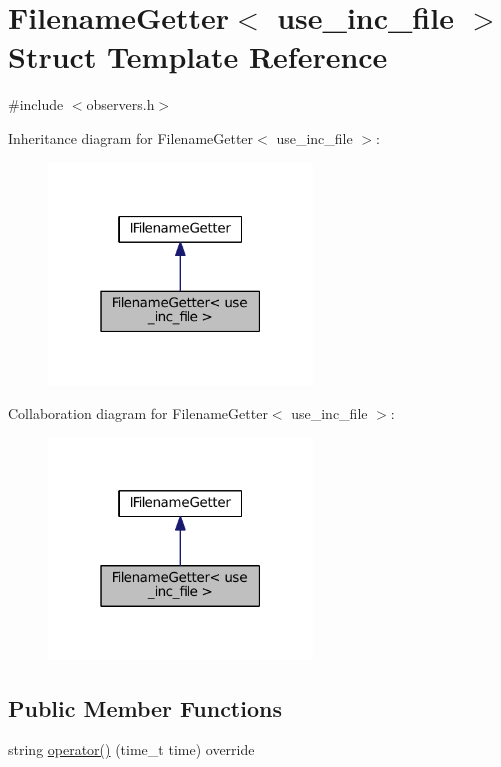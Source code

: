 \hypertarget{struct_filename_getter}{}\section{Filename\+Getter$<$ use\+\_\+inc\+\_\+file $>$ Struct Template Reference}
\label{struct_filename_getter}


{\ttfamily \#include $<$observers.\+h$>$}



Inheritance diagram for Filename\+Getter$<$ use\+\_\+inc\+\_\+file $>$\+:
\nopagebreak
\begin{figure}[H]
\begin{center}
\leavevmode
\includegraphics[width=199pt]{struct_filename_getter__inherit__graph}
\end{center}
\end{figure}


Collaboration diagram for Filename\+Getter$<$ use\+\_\+inc\+\_\+file $>$\+:
\nopagebreak
\begin{figure}[H]
\begin{center}
\leavevmode
\includegraphics[width=199pt]{struct_filename_getter__coll__graph}
\end{center}
\end{figure}
\subsection*{Public Member Functions}
\begin{DoxyCompactItemize}
\item 
string \hyperlink{struct_filename_getter_a39dfdbff4d78e09117f0e2d98b7044e5}{operator()} (time\+\_\+t time) override
\end{DoxyCompactItemize}
